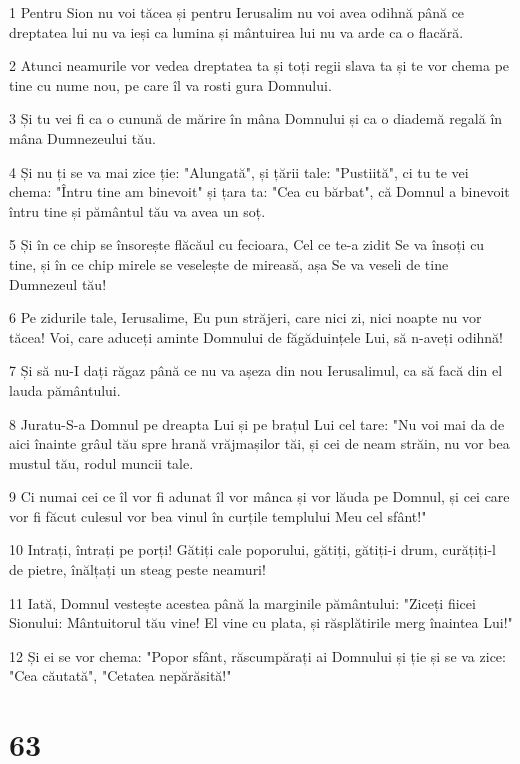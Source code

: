 \par 1 Pentru Sion nu voi tăcea și pentru Ierusalim nu voi avea odihnă până ce dreptatea lui nu va ieși ca lumina și mântuirea lui nu va arde ca o flacără.
\par 2 Atunci neamurile vor vedea dreptatea ta și toți regii slava ta și te vor chema pe tine cu nume nou, pe care îl va rosti gura Domnului.
\par 3 Și tu vei fi ca o cunună de mărire în mâna Domnului și ca o diademă regală în mâna Dumnezeului tău.
\par 4 Și nu ți se va mai zice ție: "Alungată", și țării tale: "Pustiită", ci tu te vei chema: "Întru tine am binevoit" și țara ta: "Cea cu bărbat", că Domnul a binevoit întru tine și pământul tău va avea un soț.
\par 5 Și în ce chip se însorește flăcăul cu fecioara, Cel ce te-a zidit Se va însoți cu tine, și în ce chip mirele se veselește de mireasă, așa Se va veseli de tine Dumnezeul tău!
\par 6 Pe zidurile tale, Ierusalime, Eu pun străjeri, care nici zi, nici noapte nu vor tăcea! Voi, care aduceți aminte Domnului de făgăduințele Lui, să n-aveți odihnă!
\par 7 Și să nu-I dați răgaz până ce nu va așeza din nou Ierusalimul, ca să facă din el lauda pământului.
\par 8 Juratu-S-a Domnul pe dreapta Lui și pe brațul Lui cel tare: "Nu voi mai da de aici înainte grâul tău spre hrană vrăjmașilor tăi, și cei de neam străin, nu vor bea mustul tău, rodul muncii tale.
\par 9 Ci numai cei ce îl vor fi adunat îl vor mânca și vor lăuda pe Domnul, și cei care vor fi făcut culesul vor bea vinul în curțile templului Meu cel sfânt!"
\par 10 Intrați, întrați pe porți! Gătiți cale poporului, gătiți, gătiți-i drum, curățiți-l de pietre, înălțați un steag peste neamuri!
\par 11 Iată, Domnul vestește acestea până la marginile pământului: "Ziceți fiicei Sionului: Mântuitorul tău vine! El vine cu plata, și răsplătirile merg înaintea Lui!"
\par 12 Și ei se vor chema: "Popor sfânt, răscumpărați ai Domnului și ție și se va zice: "Cea căutată", "Cetatea nepărăsită!"

\chapter{63}

